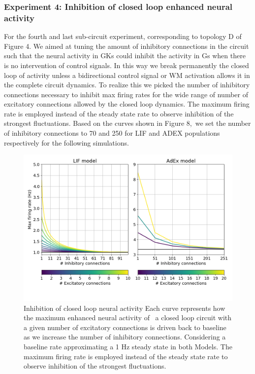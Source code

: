 \documentclass[10pt]{article}
\begin{document}
\subsubsection{Experiment 4: Inhibition of closed loop enhanced neural
  activity}

{\label{554287}}

For the fourth and last sub-circuit experiment, corresponding to
topology D of Figure 4. We aimed at tuning the amount of inhibitory
connections in the circuit such that the neural activity in GKs could
inhibit the activity in Gs when there is no intervention of control
signals. In this way we break permanently the closed loop of activity
unless a bidirectional control signal or WM activation allows it in
the complete circuit dynamics. To realize this we picked the number of
inhibitory connections necessary to inhibit max firing rates for the
wide range of number of excitatory connections allowed by the closed
loop dynamics. The maximum firing rate is employed instead of the
steady state rate to observe inhibition of the strongest fluctuations.
Based on the curves shown in Figure 8,~we set the number of inhibitory
connections to 70 and 250 for LIF and ADEX populations respectively
for the following simulations.



\begin{figure}[h!]
  \begin{center}
    \includegraphics[width=0.70\columnwidth]{figures/experiment_4/experiment_4}
    \caption{Inhibition of closed loop neural activity
      {\label{970310}} Each curve represents how the maximum enhanced
      neural activity of ~a closed loop circuit with a given number of
      excitatory connections is driven back to baseline as we increase
      the number of inhibitory connections. Considering a baseline
      rate approximating a 1 Hz steady state in both Models. The
      maximum firing rate is employed instead of the steady state rate
      to observe inhibition of the strongest fluctuations. }
    \label{970310}
  \end{center}
\end{figure}
\end{document}
